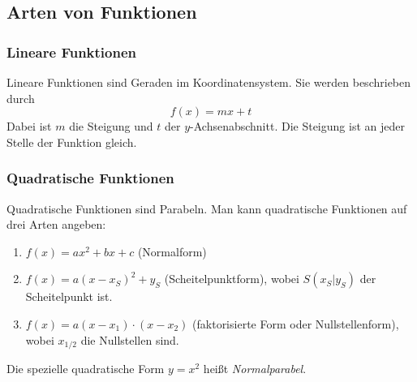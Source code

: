 \documentclass[ngerman, 12pt]{nssheetxea}
\begin{document}
\newpage

\subsection{Arten von Funktionen}

\subsubsection{Lineare Funktionen}
\begin{definition}
 
Lineare Funktionen sind Geraden im Koordinatensystem. Sie werden beschrieben durch
\[ f(x)=mx+t\]
Dabei ist $m$ die Steigung und $t$ der $y$-Achsenabschnitt. Die Steigung ist an jeder Stelle der Funktion gleich.

\begin{center}
\end{center}
\end{definition}

\subsubsection{Quadratische Funktionen}
\begin{definition}
 
Quadratische Funktionen sind Parabeln. Man kann quadratische Funktionen auf drei Arten angeben:
\begin{enumerate}
\item $f(x)=ax^2+bx+c$ (Normalform) 
\item $f(x)=a(x-x_S)^2+y_S$ (Scheitelpunktform), wobei $S(x_S|y_S)$ der Scheitelpunkt ist. 
\item $f(x)=a(x-x_1)\cdot (x-x_2)$ (faktorisierte Form oder Nullstellenform), wobei $x_{1/2}$ die Nullstellen sind. 
\end{enumerate}
Die spezielle quadratische Form $y=x^2$ heißt \textit{Normalparabel}. 
\end{definition}
\end{document}
